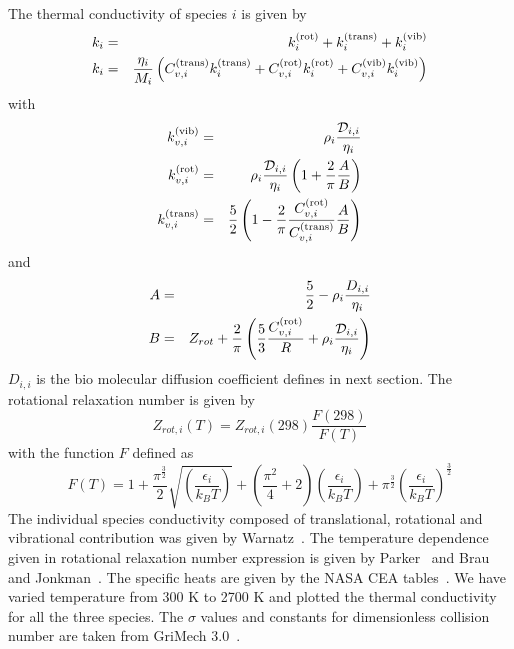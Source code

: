 The thermal conductivity of species $i$ is given by
\begin{eqnarray*}
k_i &=& k_i^{(\textnormal{rot})} + k_i^{(\textnormal{trans})} + k_i^{(\textnormal{vib})} \\
k_i &=& \frac{\eta_i}{M_i} \left(
                        C_{v,i}^{(\textnormal{trans})} k_i^{(\textnormal{trans})} + C_{v,i}^{(\textnormal{rot})} k_i^{(\textnormal{rot})}+ C_{v,i}^{(\textnormal{vib})}  k_i^{(\textnormal{vib})}
                                          \right)
\end{eqnarray*}
with
\begin{eqnarray*}
k_{v,i}^{(\textnormal{vib})}   & =& \rho_i \frac{\mathcal{D}_{i,i}}{\eta_i} \\
k_{v,i}^{(\textnormal{rot})}   & =& \rho_i \frac{\mathcal{D}_{i,i}}{\eta_i}\left(1 + \frac{2}{\pi}\frac{A}{B}\right) \\
k_{v,i}^{(\textnormal{trans})}   & =&  \frac{5}{2} \left(1 - \frac{2}{\pi}\frac{C_{v,i}^{(\textnormal{rot})}}{C_{v,i}^{(\textnormal{trans})}}\frac{A}{B}\right)
\end{eqnarray*}
%
and
%
\begin{eqnarray*}
  A & = & \frac{5}{2} -  \rho_i \frac{D_{i,i}}{\eta_i}  \\
  B & = & Z_{rot} + \frac{2}{\pi} \left(\frac{5}{3}\frac{C_{v,i}^{(\textnormal{rot})}}{R} + \rho_i \frac{\mathcal{D}_{i,i}}{\eta_i}\right)
\end{eqnarray*}
%
$D_{i,i}$ is the bio molecular diffusion coefficient defines in next section. The rotational relaxation number is given by
\begin{equation}
Z_{rot,i}(T) = Z_{rot,i}(298)\frac{F(298)}{F(T)}
\label{thermal_cond:Zrot}
\end{equation}
 with the function $F$ defined as
\begin{equation}
F(T) = 1 + \frac{\pi^{\frac{3}{2}}}{2}\sqrt{\left(\frac{\epsilon_i}{k_B T}\right)}
         + \left(\frac{\pi^2}{4} + 2\right)\left(\frac{\epsilon_i}{k_B T}\right)
         + \pi^{\frac{3}{2}}\left(\frac{\epsilon_i}{k_B T}\right)^{\frac{3}{2}}
\end{equation}
%
The individual species conductivity composed of translational,
rotational and vibrational contribution was given by
Warnatz~\cite{Warnatz}. The temperature dependence given in rotational
relaxation number expression is given by Parker~\cite{Parker} and Brau
and Jonkman~\cite{Jonkman}. The specific heats are given by the NASA CEA
 tables~\cite{CEATables}.  We have varied temperature from 300 K to 2700 K
and plotted the thermal conductivity for all the three
species. The $\sigma$ values and constants for dimensionless collision
number are taken from GriMech 3.0~\cite{gri}.

